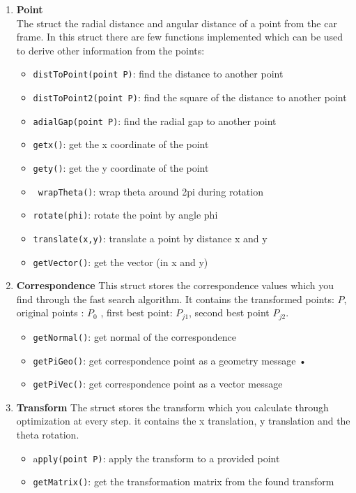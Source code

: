 \documentclass[letta4 paper]{article}
\numberwithin{equation}{section}
\newcommand{\0}{\mathbf{0}}
\begin{document}
	\begin{enumerate}
		\item \textbf{Point}\\
		The struct the radial distance and angular distance of a point from the car frame. In this struct there are few functions implemented which can be used to derive other information from the points:
		\begin{itemize}
			\item \texttt{distToPoint(point P)}: find the distance to another point
			\item \texttt{distToPoint2(point P)}: find the square of the distance to another point 
			\item \texttt{adialGap(point P)}: find the radial gap to another point
			\item \texttt{getx()}: get the x coordinate of the point
			\item \texttt{gety()}: get the y coordinate of the point
			\item \texttt{ wrapTheta()}: wrap theta around 2pi during rotation
			\item \texttt{rotate(phi)}: rotate the point by angle phi
			\item \texttt{translate(x,y)}: translate a point by distance x and y 
			\item \texttt{getVector()}: get the vector (in x and y)
		\end{itemize}
		
		\item \textbf{Correspondence}
		This struct stores the correspondence values which you find through the fast search algorithm. It contains the transformed points: $P$, original points : $P_0$ , first best point: $P_{j1}$, second best point $P_{j2}$.
		\begin{itemize}
			\item \texttt{getNormal()}: get normal of the correspondence
			\item \texttt{getPiGeo()}: get correspondence point as a geometry message •
			\item \texttt{getPiVec()}: get correspondence point as a vector message
		\end{itemize}
	
		\item \textbf{Transform}
		The struct stores the transform which you calculate through optimization at every step. it contains the x translation, y translation and the theta rotation.
		\begin{itemize}
			\item a\texttt{pply(point P)}: apply the transform to a provided point
			\item \texttt{getMatrix()}: get the transformation matrix from the found transform
		\end{itemize}
	\end{enumerate}
\end{document}
